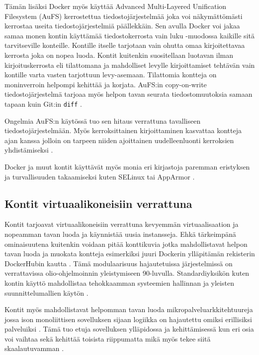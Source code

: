 \documentclass[finnish,gradu]{tktltiki3}
\begin{document}
    Tämän lisäksi Docker myös käyttää Advanced Multi-Layered Unification Filesystem (AuFS) kerrostettua tiedostojärjestelmää joka voi näkymättömästi kerrostaa useita tiedostojärjestelmiä päällekkäin. Sen avulla Docker voi jakaa samaa monen kontin käyttämää tiedostokerrosta vain luku -muodossa kaikille sitä tarvitseville konteille. Kontille itselle tarjotaan vain ohutta omaa kirjoitettavaa kerrosta joka on nopea luoda. Kontit kuitenkin suositellaan luotavan ilman kirjoituskerrosta eli tilattomana ja mahdolliset levylle kirjoittamiset tehtävän vain kontille varta vasten tarjottuun levy-asemaan. Tilattomia kontteja on moninverroin helpompi kehittää ja korjata. AuFS:in copy-on-write tiedostojärjestelmä tarjoaa myös helpon tavan seurata tiedostomuutoksia samaan tapaan kuin Git:in \texttt{diff} \cite{docker}.
    
    Ongelmia AuFS:n käytössä tuo sen hitaus verrattuna tavalliseen tiedostojärjestelmään. Myös kerroksittainen kirjoittaminen kasvattaa kontteja ajan kanssa jolloin on tarpeen niiden ajoittainen uudelleenluonti kerroksien yhdistämiseksi \cite{containers-in-multi-user-environments}.
    
    Docker ja muut kontit käyttävät myös monia eri kirjastoja paremman eristyksen ja turvallisuuden takaamiseksi kuten SELinux tai AppArmor \cite{practical-container}.
    
    \subsection{Kontit virtuaalikoneisiin verrattuna}
    
    Kontit tarjoavat virtuaalikoneisiin verrattuna kevyemmän virtuaalisaation ja nopeamman tavan luoda ja käynnistää uusia instansseja. Ehkä tärkeimpänä ominaisuutena kuitenkin voidaan pitää konttikuvia jotka mahdollistavat helpon tavan luoda ja muokata kontteja esimerkiksi juuri Dockerin ylläpitämän rekisterin DockerHubin kautta \cite{docker}. Tämä modulaarisuus hajautetuissa järjestelmissä on verrattavissa olio-ohjelmoinnin yleistymiseen 90-luvulla. Standardiyksikön kuten kontin käyttö mahdollistaa tehokkaamman systeemien hallinnan ja yleisten suunnittelumallien käytön \cite{container-design-patterns}.
    
    Kontit myös mahdollistavat helpomman tavan luoda mikropalveluarkkitehtuureja jossa ison monoliittisen sovelluksen sijaan logiikka on hajautettu omiksi erillisiksi palveluiksi \cite{practical-container, container-design-patterns}. Tämä tuo etuja sovelluksen ylläpidossa ja kehittämisessä kun eri osia voi vaihtaa sekä kehittää toisista riippumatta mikä myös tekee siitä skaalautuvamman \cite{goto-netflix}.
    
\end{document}
